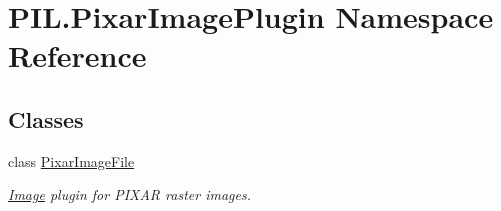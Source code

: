 \hypertarget{namespacePIL_1_1PixarImagePlugin}{}\section{P\+I\+L.\+Pixar\+Image\+Plugin Namespace Reference}
\label{namespacePIL_1_1PixarImagePlugin}
\subsection*{Classes}
\begin{DoxyCompactItemize}
\item 
class \hyperlink{classPIL_1_1PixarImagePlugin_1_1PixarImageFile}{Pixar\+Image\+File}
\begin{DoxyCompactList}\small\item\em \hyperlink{namespacePIL_1_1Image}{Image} plugin for P\+I\+X\+AR raster images. \end{DoxyCompactList}\end{DoxyCompactItemize}

